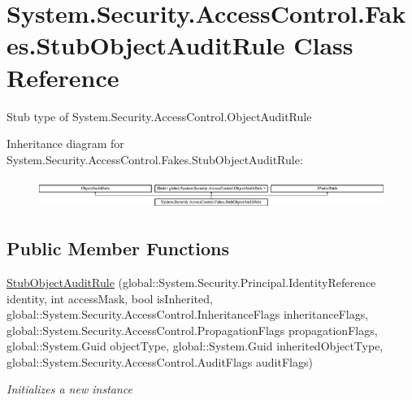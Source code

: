 \hypertarget{class_system_1_1_security_1_1_access_control_1_1_fakes_1_1_stub_object_audit_rule}{\section{System.\-Security.\-Access\-Control.\-Fakes.\-Stub\-Object\-Audit\-Rule Class Reference}
\label{class_system_1_1_security_1_1_access_control_1_1_fakes_1_1_stub_object_audit_rule}
}


Stub type of System.\-Security.\-Access\-Control.\-Object\-Audit\-Rule 


Inheritance diagram for System.\-Security.\-Access\-Control.\-Fakes.\-Stub\-Object\-Audit\-Rule\-:\begin{figure}[H]
\begin{center}
\leavevmode
\includegraphics[height=0.974761cm]{class_system_1_1_security_1_1_access_control_1_1_fakes_1_1_stub_object_audit_rule}
\end{center}
\end{figure}
\subsection*{Public Member Functions}
\begin{DoxyCompactItemize}
\item 
\hyperlink{class_system_1_1_security_1_1_access_control_1_1_fakes_1_1_stub_object_audit_rule_a9f0f18262d4cff850d8d32b755e6b351}{Stub\-Object\-Audit\-Rule} (global\-::\-System.\-Security.\-Principal.\-Identity\-Reference identity, int access\-Mask, bool is\-Inherited, global\-::\-System.\-Security.\-Access\-Control.\-Inheritance\-Flags inheritance\-Flags, global\-::\-System.\-Security.\-Access\-Control.\-Propagation\-Flags propagation\-Flags, global\-::\-System.\-Guid object\-Type, global\-::\-System.\-Guid inherited\-Object\-Type, global\-::\-System.\-Security.\-Access\-Control.\-Audit\-Flags audit\-Flags)
\begin{DoxyCompactList}\small\item\em Initializes a new instance\end{DoxyCompactList}\end{DoxyCompactItemize}
